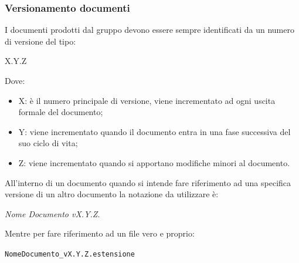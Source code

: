 \documentclass[a4paper]{article}
\begin{document}
		\subsubsection{Versionamento documenti}
		I documenti prodotti dal gruppo devono essere sempre identificati da un numero di versione del tipo:
		\begin{center}
			X.Y.Z
		\end{center}
		Dove:
		\begin{itemize}
			\item X: è il numero principale di versione, viene incrementato ad ogni uscita formale del documento;
			\item Y: viene incrementato quando il documento entra in una fase successiva del suo ciclo di vita;
			\item Z: viene incrementato quando si apportano modifiche minori al documento.
		\end{itemize}
		All'interno di un documento quando si intende fare riferimento ad una specifica versione di un altro documento la
		notazione da utilizzare è:
		\begin{center}
			\emph{Nome Documento vX.Y.Z}.
		\end{center}
		Mentre per fare riferimento ad un file vero e proprio:
		\begin{center}
			\verb|NomeDocumento_vX.Y.Z.estensione|
		\end{center}
\end{document}
